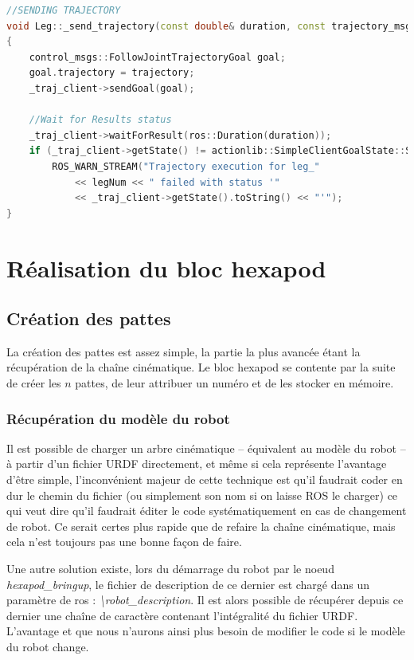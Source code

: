 \documentclass{tnreport}
\begin{document}
\newpage
\begin{lstlisting}[language=c++,caption={Implémentation de la souscription à un topic ROS}, label={lst:sendtraj}]
//SENDING TRAJECTORY
void Leg::_send_trajectory(const double& duration, const trajectory_msgs::JointTrajectory& trajectory)
{
    control_msgs::FollowJointTrajectoryGoal goal;
    goal.trajectory = trajectory;
    _traj_client->sendGoal(goal);

    //Wait for Results status
    _traj_client->waitForResult(ros::Duration(duration));
    if (_traj_client->getState() != actionlib::SimpleClientGoalState::SUCCEEDED)
        ROS_WARN_STREAM("Trajectory execution for leg_"
            << legNum << " failed with status '"
            << _traj_client->getState().toString() << "'");
}
\end{lstlisting}
\section{Réalisation du bloc hexapod}
\subsection{Création des pattes}
La création des pattes est assez simple, la partie la plus avancée étant la récupération de la chaîne cinématique. Le bloc hexapod se contente par la suite de créer les $n$ pattes, de leur attribuer un numéro et de les stocker en mémoire. 

\subsubsection{Récupération du modèle du robot}\label{lb:creapatte}

Il est possible de charger un arbre cinématique -- équivalent au modèle du robot -- à partir d'un fichier URDF directement, et même si cela représente l'avantage d'être simple, l'inconvénient majeur de cette technique est qu'il faudrait coder en dur le chemin du fichier (ou simplement son nom si on laisse ROS le charger) ce qui veut dire qu'il faudrait éditer le code systématiquement en cas de changement de robot. Ce serait certes plus rapide que de refaire la chaîne cinématique, mais cela n'est toujours pas une bonne façon de faire. 

Une autre solution existe, lors du démarrage du robot par le noeud \textit{hexapod\_bringup}, le fichier de description de ce dernier est chargé dans un paramètre de ros : \textit{\textbackslash robot\_description}. Il est alors possible de récupérer depuis ce dernier une chaîne de caractère contenant l'intégralité du fichier URDF. L'avantage et que nous n'aurons ainsi plus besoin de modifier le code si le modèle du robot change. 
\end{document}
